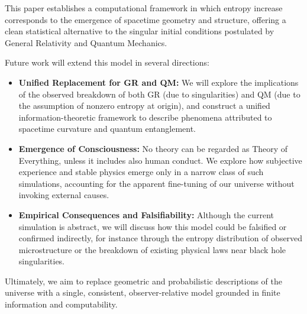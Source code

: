 \documentclass[11pt]{article}
\begin{document}
This paper establishes a computational framework in which entropy increase corresponds to the emergence of spacetime geometry and structure, offering a clean statistical alternative to the singular initial conditions postulated by General Relativity and Quantum Mechanics.

Future work will extend this model in several directions:

\begin{itemize}
   \item \textbf{Unified Replacement for GR and QM:} We will explore the implications of the observed breakdown of both GR (due to singularities) and QM (due to the assumption of nonzero entropy at origin), and construct a unified information-theoretic framework to describe phenomena attributed to spacetime curvature and quantum entanglement.

   \item \textbf{Emergence of Consciousness:} No theory can be regarded as Theory of Everything, unless it includes also human conduct. We explore how subjective experience and stable physics emerge only in a narrow class of such simulations, accounting for the apparent fine-tuning of our universe without invoking external causes.

   \item \textbf{Empirical Consequences and Falsifiability:} Although the current simulation is abstract, we will discuss how this model could be falsified or confirmed indirectly, for instance through the entropy distribution of observed microstructure or the breakdown of existing physical laws near black hole singularities.
\end{itemize}

Ultimately, we aim to replace geometric and probabilistic descriptions of the universe with a single, consistent, observer-relative model grounded in finite information and computability.


\ifmain
\else
\end{document}
